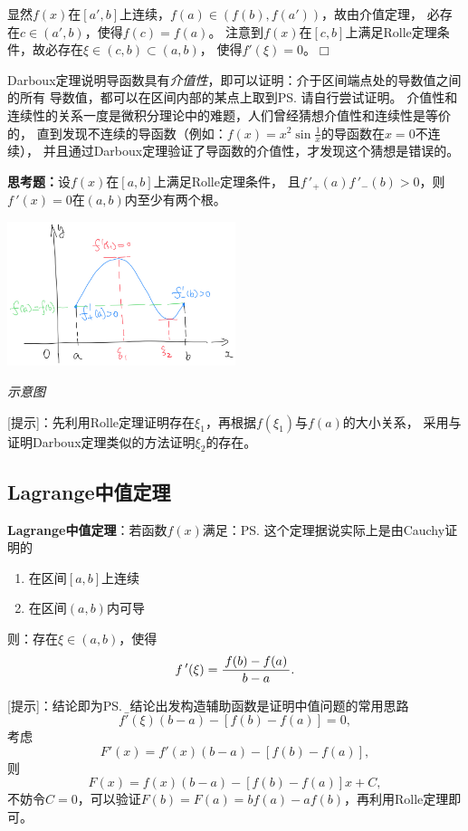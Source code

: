 显然$f(x)$在$[a',b]$上连续，$f(a)\in(f(b),f(a'))$，故由介值定理，
必存在$c\in(a',b)$，使得$f(c)=f(a)$。
注意到$f(x)$在$[c,b]$上满足Rolle定理条件，故必存在$\xi\in(c,b)\subset(a,b)$，
使得$f'(\xi)=0$。\hfill$\Box$

Darboux定理说明导函数具有{\it 介值性}，即可以证明：介于区间端点处的导数值之间的所有
导数值，都可以在区间内部的某点上取到\ps{请自行尝试证明}。
介值性和连续性的关系一度是微积分理论中的难题，人们曾经猜想介值性和连续性是等价的，
直到发现不连续的导函数（例如：$f(x)=x^2\sin\frac1x$的导函数在$x=0$不连续），
并且通过Darboux定理验证了导函数的介值性，才发现这个猜想是错误的。

{\bf 思考题：}设$f(x)$在$[a,b]$上满足Rolle定理条件，
且$f\,'_+(a)f\,'_-(b)>0$，则$f\,'(x)=0$在$(a,b)$内至少有两个根。

\begin{center}
	\includegraphics[width=0.5\textwidth]{./images/ch3/Darboux2.jpg}
	
	\it 示意图
\end{center}
[提示]：先利用Rolle定理证明存在$\xi_1$，再根据$f(\xi_1)$与$f(a)$的大小关系，
采用与证明Darboux定理类似的方法证明$\xi_2$的存在。

\subsection{Lagrange中值定理}

\begin{thx}
	{\bf Lagrange中值定理}：若函数$f(x)$满足：\ps{这个定理据说实际上是由Cauchy证明的}
	\begin{enumerate}[(1)]
	  \setlength{\itemindent}{1cm}
	  \item 在区间$[a,b]$上连续 
	  \item 在区间$(a,b)$内可导 
	\end{enumerate}
	则：存在$\xi\in(a,b)$，使得 
	$$f\,'(\xi)=\displaystyle\frac{\,{f(b)-f(a)}\,}{\,{b-a}\,}.$$
\end{thx}

[提示]：结论即为\ps{\b 从结论出发构造辅助函数是证明中值问题的常用思路}
$$f'(\xi)(b-a)-[f(b)-f(a)]=0,$$
考虑
$$F'(x)=f'(x)(b-a)-[f(b)-f(a)],$$
则
$$F(x)=f(x)(b-a)-[f(b)-f(a)]x+C,$$
不妨令$C=0$，可以验证$F(b)=F(a)=bf(a)-af(b)$，再利用Rolle定理即可。

